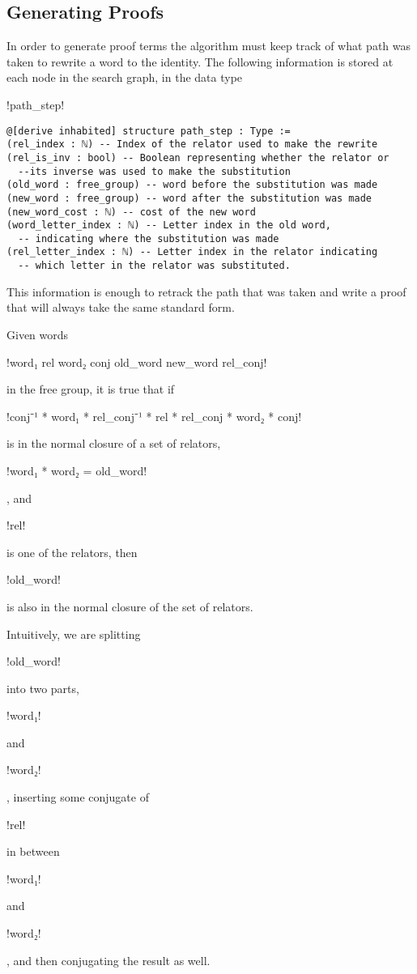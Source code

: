 \documentclass[11pt]{article} %
\theoremstyle{definition}
\theoremstyle{definition}
\theoremstyle{definition}
\theoremstyle{definition}
\theoremstyle{definition}
\theoremstyle{definition}
\begin{document}
\subsection{Generating Proofs}
In order to generate proof terms the algorithm must keep track of what path was taken
to rewrite a word to the identity. The following information is stored at each node
in the search graph, in the data type
\begin{lstinline}
  !path_step!
\end{lstinline}

\begin{lstlisting}
@[derive inhabited] structure path_step : Type :=
(rel_index : ℕ) -- Index of the relator used to make the rewrite
(rel_is_inv : bool) -- Boolean representing whether the relator or
  --its inverse was used to make the substitution
(old_word : free_group) -- word before the substitution was made
(new_word : free_group) -- word after the substitution was made
(new_word_cost : ℕ) -- cost of the new word
(word_letter_index : ℕ) -- Letter index in the old word,
  -- indicating where the substitution was made
(rel_letter_index : ℕ) -- Letter index in the relator indicating
  -- which letter in the relator was substituted.
\end{lstlisting}

This information is enough to retrack the path that was taken and write a
proof that will always take the same standard form.

Given words \begin{lstinline} !word₁ rel word₂ conj old_word new_word rel_conj! \end{lstinline}
in the free group, it is true that if
\begin{lstinline} !conj⁻¹ * word₁ * rel_conj⁻¹ * rel * rel_conj * word₂ * conj! \end{lstinline}
is in the normal closure of a set of relators, \begin{lstinline}!word₁ * word₂ = old_word!\end{lstinline},
and \begin{lstinline}!rel!\end{lstinline} is
one of the relators, then \begin{lstinline}!old_word!\end{lstinline} is also in the
normal closure of the set of relators.

Intuitively, we are splitting \begin{lstinline}!old_word!\end{lstinline} into two parts,
\begin{lstinline}!word₁!\end{lstinline} and \begin{lstinline}!word₂!\end{lstinline},
inserting some conjugate of \begin{lstinline}!rel!\end{lstinline} in between
\begin{lstinline}!word₁!\end{lstinline} and \begin{lstinline}!word₂!\end{lstinline},
and then conjugating the result as well.
\end{document}
